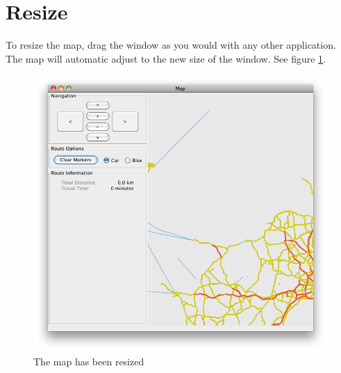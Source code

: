 \section{Resize}
\label{MAN-RS}
To resize the map, drag the window as you would with any other application. The
map will automatic adjust to the new size of the window. See figure
\ref{MAN-RES}.
\begin{figure}[h!]
\centering
\includegraphics[width=1\linewidth]{images/man-resize.png}
\caption{The map has been resized}
\label{MAN-RES}
\end{figure}